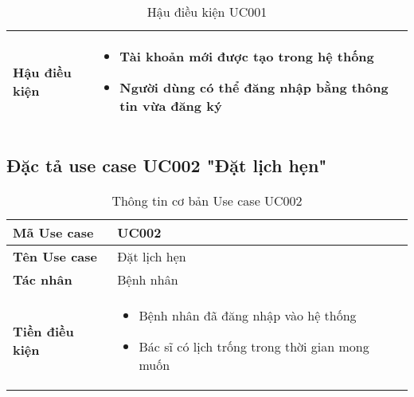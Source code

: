 \documentclass[../DoAn.tex]{subfiles}
\begin{document}
\begin{table}[H]
\centering
\begin{tabular}{|p{3cm}|p{10cm}|}
\hline
\textbf{Hậu điều kiện} & 
\begin{itemize}
    \item Tài khoản mới được tạo trong hệ thống
    \item Người dùng có thể đăng nhập bằng thông tin vừa đăng ký
\end{itemize} \\
\hline
\end{tabular}
\caption{Hậu điều kiện UC001}
\end{table}

\subsection{Đặc tả use case UC002 "Đặt lịch hẹn"}
\label{subsection:2.3.2}

\begin{table}[H]
\centering
\begin{tabular}{|p{3cm}|p{10cm}|}
\hline
\textbf{Mã Use case} & UC002 \\
\hline
\textbf{Tên Use case} & Đặt lịch hẹn \\
\hline
\textbf{Tác nhân} & Bệnh nhân \\
\hline
\textbf{Tiền điều kiện} & 
\begin{itemize}
    \item Bệnh nhân đã đăng nhập vào hệ thống
    \item Bác sĩ có lịch trống trong thời gian mong muốn
\end{itemize} \\
\hline
\end{tabular}
\caption{Thông tin cơ bản Use case UC002}
\end{table}
\end{document}
